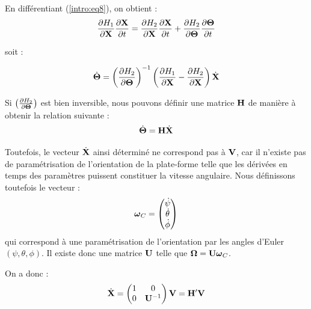 En différentiant (\ref{intro:eq8}), on obtient :
\begin{equation}
\frac{\partial H_1}{\partial {\bf X}} \frac{\partial {\bf X}}{\partial t} 
=  \frac{\partial H_2}{\partial {\bf X}} \frac{\partial {\bf X}}{\partial t} + 
\frac{\partial H_2}{\partial {\bf \Theta}} \frac{\partial {\bf 
\Theta}}{\partial t}
\label{intro:eq9}
\end{equation}

soit :

\begin{equation}
\dot {\bf \Theta} = \left ( \frac{\partial H_2}{\partial {\bf \Theta}} \right 
)^{-1} \left (\frac{\partial H_1}{\partial {\bf X}} - \frac{\partial 
H_2}{\partial {\bf X}} \right ) \dot {\bf X}
\label{intro:eq10}
\end{equation}

Si $\left ( \frac{\partial H_2}{\partial {\bf \Theta}} \right )$ est bien 
inversible, nous pouvons définir une matrice ${\bf H}$ de manière à 
obtenir la relation suivante :
\begin{equation}
\dot {\bf \Theta} = {\bf H} \dot {\bf X}
\label{intro:eq11}
\end{equation}

Toutefois, le vecteur $\dot {\bf X}$ ainsi d\'etermin\'e ne correspond pas \`a 
$\bf V$, car il n'existe pas de paramétrisation de l'orientation de la 
plate-forme telle que les dérivées en temps des paramètres puissent constituer 
la vitesse angulaire. Nous définissons toutefois le vecteur :
\begin{equation}
\hbox{\boldmath $\omega$}_C = \left ( \begin{matrix}
                \dot \psi \\
                \dot \theta \\
                \dot \phi       
               \end{matrix} \right )
\label{intro:eq11c}
\end{equation}
qui correspond à une paramétrisation de l'orientation par les angles d'Euler 
$(\psi, \theta, \phi)$. Il existe donc une matrice $\bf U$ telle que ${\bf 
\Omega} = {\bf U} {\hbox{\boldmath $\omega$}}_C$.

On a donc :
\begin{equation}
\dot {\bf X} = \left ( \begin{matrix}
                1 & 0 \\
                0 & {\bf U}^{-1}
               \end{matrix} \right ) {\bf V} = {\bf H}' {\bf V}
\label{intro:eq11c2}
\end{equation}

